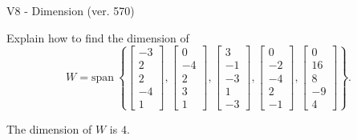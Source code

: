 \begin{exercise}
  \begin{exerciseTitle}V8 - Dimension (ver. 570)\end{exerciseTitle}
  \begin{exerciseStatement}
    Explain how to find the dimension of 
\[W=\mathrm{span}\ \left\{\left[\begin{array}{r}
-3 \\
2 \\
2 \\
-4 \\
1
\end{array}\right] , \left[\begin{array}{r}
0 \\
-4 \\
2 \\
3 \\
1
\end{array}\right] , \left[\begin{array}{r}
3 \\
-1 \\
-3 \\
1 \\
-3
\end{array}\right] , \left[\begin{array}{r}
0 \\
-2 \\
-4 \\
2 \\
-1
\end{array}\right] , \left[\begin{array}{r}
0 \\
16 \\
8 \\
-9 \\
4
\end{array}\right]\right\}.\]



  \end{exerciseStatement}
  \begin{exerciseAnswer}
   The dimension of \(W\) is  \(4\).
  


  \end{exerciseAnswer}
\end{exercise}